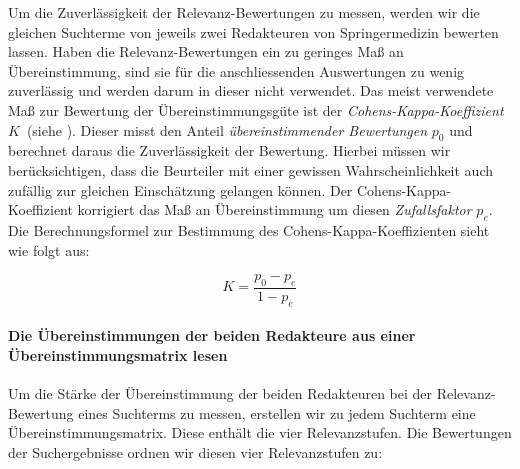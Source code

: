 Um die Zuverlässigkeit der Relevanz-Bewertungen zu messen, werden wir die gleichen Suchterme von jeweils zwei Redakteuren von Springermedizin bewerten lassen. Haben die Relevanz-Bewertungen ein zu geringes Maß an Übereinstimmung, sind sie für die anschliessenden Auswertungen zu wenig zuverlässig und werden darum in dieser nicht verwendet. Das meist verwendete Maß zur Bewertung der Übereinstimmungsgüte ist der \textit{Cohens-Kappa-Koeffizient} $K$~(siehe \cite{Kappa}). Dieser misst den Anteil \textit{übereinstimmender Bewertungen} $p_0$ und berechnet daraus die Zuverlässigkeit der Bewertung. Hierbei müssen wir berücksichtigen, dass die Beurteiler mit einer gewissen Wahrscheinlichkeit auch zufällig zur gleichen Einschätzung gelangen können. Der Cohens-Kappa-Koeffizient korrigiert das Maß an Übereinstimmung um diesen \textit{Zufallsfaktor} $p_e$. Die Berechnungsformel zur Bestimmung des Cohens-Kappa-Koeffizienten sieht wie folgt aus:

\vspace{-1.5em}
\begin{equation}	
	K = \frac{p_0 - p_e}{1 - p_e}
\end{equation}
\vspace{-1.5em}

\paragraph{Die Übereinstimmungen der beiden Redakteure aus einer Übereinstimmungsmatrix lesen}
Um die Stärke der Übereinstimmung der beiden Redakteuren bei der Relevanz-Bewertung eines Suchterms zu messen, erstellen wir zu jedem Suchterm eine Übereinstimmungsmatrix. Diese enthält die vier Relevanzstufen. Die Bewertungen der Suchergebnisse ordnen wir diesen vier Relevanzstufen zu:

